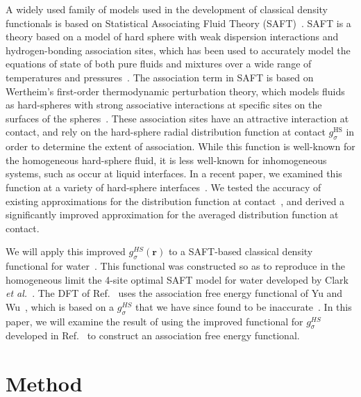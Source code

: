 \documentclass[twocolumn,amsmath,amssymb,prl]{revtex4-1}
\newcommand{\rr}{\textbf{r}}
\begin{document}
A widely used family of models used in the development of classical
density functionals is based on Statistical Associating Fluid Theory
(SAFT)~\cite{chapman1989saft}.  SAFT is a theory based on a model of
hard sphere with weak dispersion interactions and hydrogen-bonding
association sites, which has been used to accurately model the
equations of state of both pure fluids and mixtures over a wide range
of temperatures and pressures~\cite{muller2001molecular,
  tan2008recent}.  The association term in SAFT is based on Wertheim's
first-order thermodynamic perturbation theory, which models fluids as
hard-spheres with strong associative interactions at specific sites on
the surfaces of the spheres~\cite{wertheim1984fluidsI,
  wertheim1984fluidsII, wertheim1986fluidsIII, wertheim1986fluidsIV}.
These association sites have an attractive interaction at contact, and
rely on the hard-sphere radial distribution function at contact
$g_\sigma^\text{HS}$ in order to determine the extent of association.
While this function is well-known for the homogeneous hard-sphere
fluid, it is less well-known for inhomogeneous systems, such as occur
at liquid interfaces.  In a recent paper, we examined this function at
a variety of hard-sphere interfaces~\cite{schulte2012using}.  We
tested the accuracy of existing approximations for the distribution
function at contact~\cite{yu2002fmt-dft-inhomogeneous-associating,
  gross2009density}, and derived a significantly improved
approximation for the averaged distribution function at contact.

We will apply this improved $g_\sigma^{HS}(\rr)$ to a SAFT-based
classical density functional for water~\cite{hughes2013classical}.
This functional was constructed so as to reproduce in the homogeneous
limit the 4-site optimal SAFT model for water developed by Clark
\emph{et al.}~\cite{clark2006developing}.  The DFT of
Ref.~ uses the association free energy
functional of Yu and
Wu~\cite{yu2002fmt-dft-inhomogeneous-associating}, which is based on a
$g_\sigma^{HS}$ that we have since found to be
inaccurate~\cite{schulte2012using}.  In this paper, we will examine
the result of using the improved functional for $g_\sigma^{HS}$
developed in Ref.~ to construct an
association free energy functional.

\section{Method}
\end{document}
